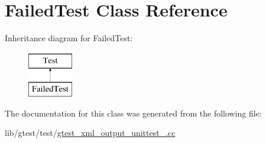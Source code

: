 \hypertarget{class_failed_test}{\section{Failed\-Test Class Reference}
\label{class_failed_test}
}
Inheritance diagram for Failed\-Test\-:\begin{figure}[H]
\begin{center}
\leavevmode
\includegraphics[height=2.000000cm]{class_failed_test}
\end{center}
\end{figure}


The documentation for this class was generated from the following file\-:\begin{DoxyCompactItemize}
\item 
lib/gtest/test/\hyperlink{gtest__xml__output__unittest___8cc}{gtest\-\_\-xml\-\_\-output\-\_\-unittest\-\_\-.\-cc}\end{DoxyCompactItemize}
